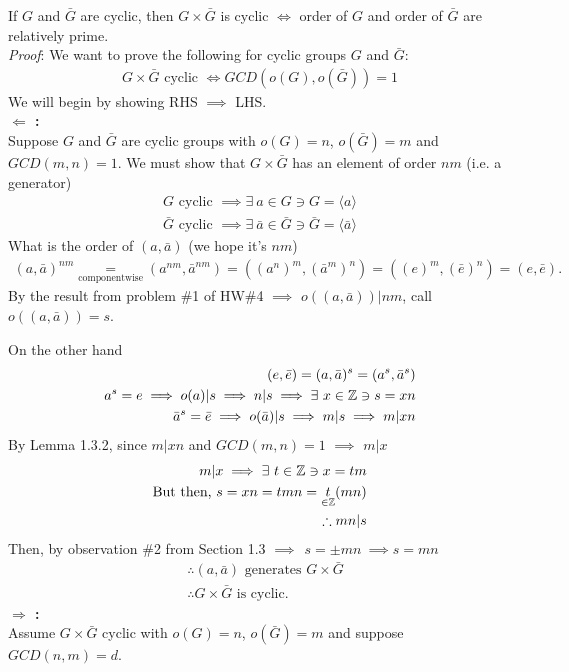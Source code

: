 \begin{proposition}
    If $G$ and $\bar{G}$ are cyclic, then $G\times \bar{G}$ is cyclic $\iff$ order of $G$ and order of $\bar{G}$ are relatively prime. \steezybreak\\
    \textit{Proof}: We want to prove the following for cyclic groups $G$ and $\bar{G}$: 
    \begin{align}
        G\times\bar{G} \text{ cyclic } \iff GCD(o(G),o(\bar{G}))=1 \nonumber
    \end{align}
We will begin by showing RHS $\implies$ LHS. \steezybreak\\
\noindent \textbf{$\Leftarrow$ :} \steezybreak\\
\noindent Suppose $G$ and $\bar{G}$ are cyclic groups with $o(G)=n$, $o(\bar{G})=m$ and $GCD(m,n)=1$. We must show that $G\times \bar{G}$ has an element of order $nm$ (i.e. a generator)
\begin{align}
    G \text{ cyclic }\implies \exists \ a \in G \ni G= \langle a \rangle \nonumber \\
    \bar{G} \text{ cyclic }\implies \exists \ \bar{a} \in \bar{G} \ni \bar{G}= \langle \bar{a} \rangle \nonumber 
\end{align}
What is the order of $(a,\bar{a})$ (we hope it's $nm$)
\begin{align}
    (a,\bar{a})^{nm} \underset{\text{componentwise}}{=} (a^{nm},\bar{a}^{nm}) =((a^n)^m,(\bar{a}^m)^n) = ((e)^m,(\bar{e})^n)=(e,\bar{e}). \nonumber
\end{align}
By the result from problem \#1 of HW\#4 $\implies$ $o((a,\bar{a}))|nm$, call $o((a,\bar{a}))=s$. \steezybreak\\
\begin{center}
\end{center}
On the other hand
\begin{align}
    (e,\bar{e})=(a,\bar{a})^s = (a^s,\bar{a}^s) \nonumber \\
    a^s= e \implies o(a)|s \implies n | s \implies \exists \ x \in {\mathbb{ Z}} \ni s=xn \nonumber \\
    \bar{a}^s = \bar{e} \implies o(\bar{a})|s \implies m|s \implies m | xn \nonumber
\end{align}
By Lemma 1.3.2, since $m|xn$ and $GCD(m,n)=1$ $\implies$ $m|x$
\begin{align}
    m|x \implies \exists \ t\in {\mathbb{ Z}} \ni x=tm \nonumber \\
\text{But then, } s=xn=tmn = \underset{\in {\mathbb{ Z}}}{t}(mn) \nonumber \\
    \therefore mn|s \nonumber
\end{align}
Then, by observation \#2 from Section 1.3 $\implies \ \ s=\pm mn \ \implies s=mn$
\begin{align}
    &\therefore (a,\bar{a}) \text{ generates } G\times \bar{G} \nonumber \\
    &\therefore G\times \bar{G} \text{ is cyclic.} \nonumber
\end{align}
\noindent \textbf{$\Rightarrow$ :} \steezybreak\\
\noindent Assume $G\times \bar{G}$ cyclic with $o(G)=n$, $o(\bar{G})=m$ and suppose $GCD(n,m)=d$.


\end{proposition}
